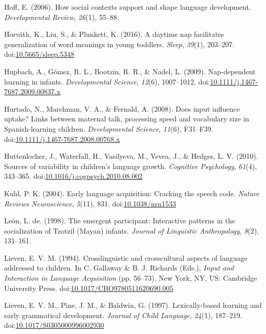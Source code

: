 \documentclass[floatsintext,man]{apa6}
\theoremstyle{definition}
\theoremstyle{definition}
\theoremstyle{definition}
\theoremstyle{remark}
\begin{document}
\hypertarget{ref-hoff2006social}{}
Hoff, E. (2006). How social contexts support and shape language
development. \emph{Developmental Review}, \emph{26}(1), 55--88.

\hypertarget{ref-horvath2016daytime}{}
Horváth, K., Liu, S., \& Plunkett, K. (2016). A daytime nap facilitates
generalization of word meanings in young toddlers. \emph{Sleep},
\emph{39}(1), 203--207.
doi:\href{https://doi.org/10.5665/sleep.5348}{10.5665/sleep.5348}

\hypertarget{ref-hupbach2009nap}{}
Hupbach, A., Gómez, R. L., Bootzin, R. R., \& Nadel, L. (2009).
Nap-dependent learning in infants. \emph{Developmental Science},
\emph{12}(6), 1007--1012.
doi:\href{https://doi.org/10.1111/j.1467-7687.2009.00837.x}{10.1111/j.1467-7687.2009.00837.x}

\hypertarget{ref-hurtado2008does}{}
Hurtado, N., Marchman, V. A., \& Fernald, A. (2008). Does input
influence uptake? Links between maternal talk, processing speed and
vocabulary size in Spanish-learning children. \emph{Developmental
Science}, \emph{11}(6), F31--F39.
doi:\href{https://doi.org/10.1111/j.1467-7687.2008.00768.x}{10.1111/j.1467-7687.2008.00768.x}

\hypertarget{ref-huttenlocher2010sources}{}
Huttenlocher, J., Waterfall, H., Vasilyeva, M., Vevea, J., \& Hedges, L.
V. (2010). Sources of variability in children's language growth.
\emph{Cognitive Psychology}, \emph{61}(4), 343--365.
doi:\href{https://doi.org/10.1016/j.cogpsych.2010.08.002}{10.1016/j.cogpsych.2010.08.002}

\hypertarget{ref-kuhl2004early}{}
Kuhl, P. K. (2004). Early language acquisition: Cracking the speech
code. \emph{Nature Reviews Neuroscience}, \emph{5}(11), 831.
doi:\href{https://doi.org/10.1038/nrn1533}{10.1038/nrn1533}

\hypertarget{ref-deleon1998emergent}{}
León, L. de. (1998). The emergent participant: Interactive patterns in
the socialization of Tzotzil (Mayan) infants. \emph{Journal of
Linguistic Anthropology}, \emph{8}(2), 131--161.

\hypertarget{ref-lieven1994crosslinguistic}{}
Lieven, E. V. M. (1994). Crosslinguistic and crosscultural aspects of
language addressed to children. In C. Gallaway \& B. J. Richards (Eds.),
\emph{Input and Interaction in Language Acquisition} (pp. 56--73). New
York, NY, US: Cambridge University Press.
doi:\href{https://doi.org/10.1017/CBO9780511620690.005}{10.1017/CBO9780511620690.005}

\hypertarget{ref-lieven1997lexically}{}
Lieven, E. V. M., Pine, J. M., \& Baldwin, G. (1997). Lexically-based
learning and early grammatical development. \emph{Journal of Child
Language}, \emph{24}(1), 187--219.
doi:\href{https://doi.org/10.1017/S0305000996002930}{10.1017/S0305000996002930}
\end{document}
